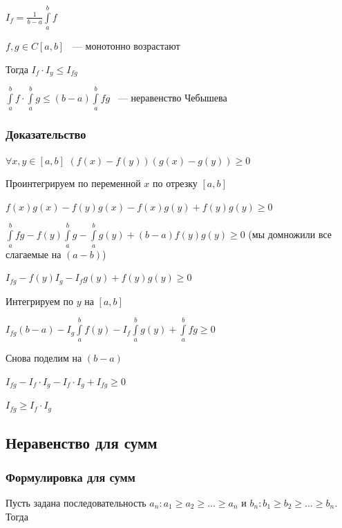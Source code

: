 \documentclass{article}
\begin{document}
                $I_f = \frac{1}{b - a} \int\limits^b_a f$
		
                $f, g \in C[a, b]$ ~--- монотонно возрастают
			
                Тогда $I_f \cdot I_y \leq I_{fg}$
		
                $\int\limits^b_a f \cdot \int\limits^b_a g \leq (b - a) \int\limits^b_a fg$ ~--- неравенство Чебышева
		
            \subsubsection{Доказательство}
		
                $\forall x, y \in [a, b]$ $(f(x) - f(y))(g(x)-g(y)) \geq 0$
			
                Проинтегрируем по переменной $x$ по отрезку $[a, b]$
			
                $f(x)g(x) - f(y)g(x) - f(x)g(y) + f(y)g(y) \geq 0$
			
                $\int\limits^b_a fg - f(y) \int\limits^b_a g - \int\limits^b_a g(y) + (b - a) f(y) g(y) \geq 0$ (мы домножили все слагаемые на $(a - b)$)
                
                $I_{fg} - f(y)I_g - I_f g(y) + f(y)g(y) \geq 0$
			
                Интегрируем по $y$ на $[a, b]$
			
                $I_{fg} (b - a) - I_g \int\limits^b_a f(y) - I_f \int\limits^b_a g(y) + \int\limits^b_a fg \geq 0$
                
                Снова поделим на $(b - a)$
                
                $I_{fg} - I_f \cdot I_g - I_f \cdot I_g + I_{fg} \geq 0$
			
                $I_{fg} \geq I_f \cdot I_g$
                
        \subsection{Неравенство для сумм}
        
            \subsubsection{Формулировка для сумм}
            
                Пусть задана последовательность $a_n : a_1 \geq a_2 \geq \ldots \geq a_n$ и $b_n : b_1 \geq b_2 \geq \ldots \geq b_n$. Тогда
                
\end{document}
